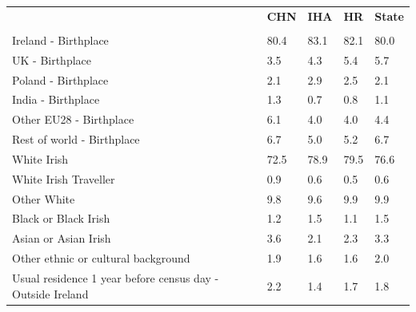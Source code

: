 \documentclass{article}
\begin{document}
\pagebreak
\begin{table}[h]	
\centering
		\begin{tabular}{KTTTT}
  \hline
& \textbf{CHN} & \textbf{IHA} & \textbf{HR}& \textbf{State}\\ 
  \hline
    \\ 
    \hline
Ireland - Birthplace & 80.4& 83.1& 82.1& 80.0\\
UK - Birthplace & 3.5& 4.3& 5.4& 5.7\\
Poland - Birthplace & 2.1& 2.9& 2.5& 2.1\\
India - Birthplace & 1.3& 0.7& 0.8& 1.1\\
Other EU28 - Birthplace & 6.1& 4.0& 4.0& 4.4\\
Rest of world - Birthplace & 6.7& 5.0& 5.2& 6.7\\
    \hline
White Irish & 72.5& 78.9& 79.5& 76.6\\
White Irish Traveller & 0.9& 0.6& 0.5& 0.6\\
Other White & 9.8& 9.6& 9.9& 9.9\\
Black or Black Irish & 1.2& 1.5& 1.1& 1.5\\
Asian or Asian Irish & 3.6& 2.1& 2.3& 3.3\\
Other ethnic or cultural background & 1.9& 1.6& 1.6& 2.0\\
    \hline
Usual residence 1 year before census day - Outside Ireland & 2.2& 1.4& 1.7& 1.8\\


\end{tabular}
\end{table}
\end{document}
